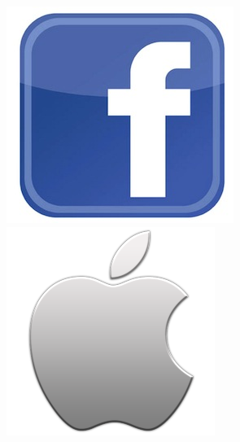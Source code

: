 \documentclass[xcolor=dvipsnames]{beamer}
\begin{document}
\begin{frame}
	\hspace{0.15cm}\includegraphics[scale=0.19]{facebook.jpg}\vspace{0.8cm}
     \hspace{0.15cm}\includegraphics[scale=0.19]{apple_logo.png}\hspace{0.8cm}

\end{frame}
\end{document}

